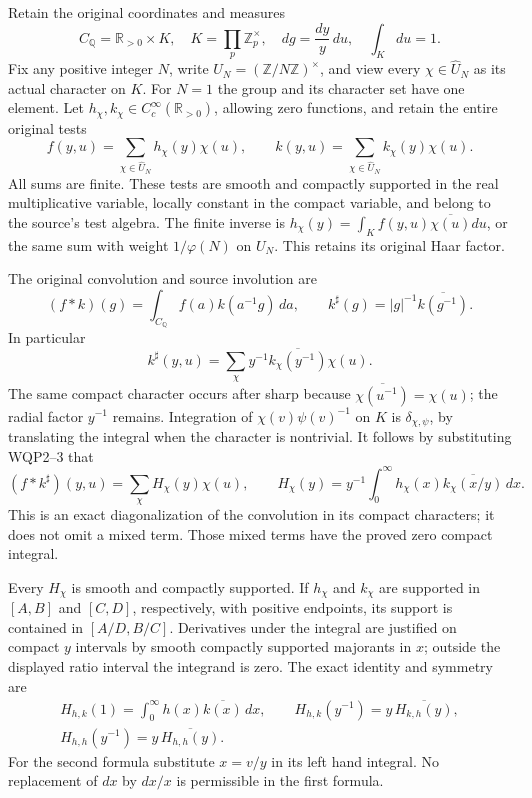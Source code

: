 Retain the original coordinates and measures
\begin{equation}\tag{WQP1}
 C_{\mathbb Q}=\mathbb R_{>0}\times K,\quad
 K=\prod_p\mathbb Z_p^\times,\quad
 dg=\frac{dy}{y}\,du,\quad \int_Kdu=1.
\end{equation}
Fix any positive integer $N$, write $U_N=(\mathbb Z/N\mathbb Z)^\times$,
and view every $\chi\in\widehat U_N$ as its actual character on $K$.
For $N=1$ the group and its character set have one element. Let
$h_\chi,k_\chi\in C_c^\infty(\mathbb R_{>0})$, allowing zero functions,
and retain the entire original tests
\begin{equation}\tag{WQP2}
 f(y,u)=\sum_{\chi\in\widehat U_N}h_\chi(y)\chi(u),\qquad
 k(y,u)=\sum_{\chi\in\widehat U_N}k_\chi(y)\chi(u).
\end{equation}
All sums are finite. These tests are smooth and compactly supported in
the real multiplicative variable, locally constant in the compact
variable, and belong to the source's test algebra. The finite inverse is
$h_\chi(y)=\int_K f(y,u)\overline{\chi(u)}du$, or the same sum with
weight $1/\varphi(N)$ on $U_N$. This retains its original Haar factor.

The original convolution and source involution are
\begin{equation}\tag{WQP3}
 (f*k)(g)=\int_{C_{\mathbb Q}}f(a)k(a^{-1}g)\,da,\qquad
 k^\sharp(g)=|g|^{-1}\overline{k(g^{-1})}.
\end{equation}
In particular
\[
 k^\sharp(y,u)=\sum_\chi y^{-1}\overline{k_\chi(y^{-1})}\chi(u).
\]
The same compact character occurs after sharp because
$\overline{\chi(u^{-1})}=\chi(u)$; the radial factor $y^{-1}$
remains. Integration of $\chi(v)\psi(v)^{-1}$ on $K$ is
$\delta_{\chi,\psi}$, by translating the integral when the character
is nontrivial. It follows by substituting WQP2--3 that
\begin{equation}\tag{WQP4}
 (f*k^\sharp)(y,u)=\sum_\chi H_\chi(y)\chi(u),\qquad
 H_\chi(y)=y^{-1}\int_0^\infty
           h_\chi(x)\overline{k_\chi(x/y)}\,dx.
\end{equation}
This is an exact diagonalization of the convolution in its compact
characters; it does not omit a mixed term. Those mixed terms have
the proved zero compact integral.

Every $H_\chi$ is smooth and compactly supported. If $h_\chi$ and
$k_\chi$ are supported in $[A,B]$ and $[C,D]$, respectively, with
positive endpoints, its support is contained in $[A/D,B/C]$.
Derivatives under the integral are justified on compact $y$ intervals
by smooth compactly supported majorants in $x$; outside the displayed
ratio interval the integrand is zero. The exact identity and symmetry are
\begin{equation}\tag{WQP5}
 \begin{gathered}
 H_{h,k}(1)=\int_0^\infty h(x)\overline{k(x)}\,dx,\qquad
 H_{h,k}(y^{-1})=y\,\overline{H_{k,h}(y)},\\
 H_{h,h}(y^{-1})=y\,\overline{H_{h,h}(y)}.
 \end{gathered}
\end{equation}
For the second formula substitute $x=v/y$ in its left hand integral.
No replacement of $dx$ by $dx/x$ is permissible in the first formula.

